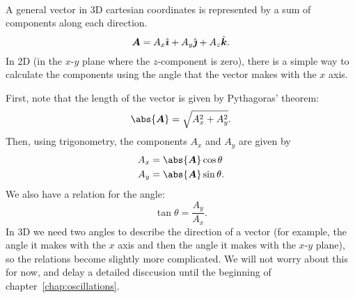 \documentclass[../classical_mechanics.tex]{subfiles}
\begin{document}
        \paragraph{}
        A general vector in 3D cartesian coordinates is represented by a sum of components along each direction.
        \begin{equation}
            \boldsymbol{A}=A_x\hat{\boldsymbol{\imath}}+A_y\hat{\boldsymbol{\jmath}}+A_z\hat{\boldsymbol{k}}.
        \end{equation}
        In 2D (in the $x$-$y$ plane where the $z$-component is zero), there is a simple way to calculate the components using the angle that the vector makes with the $x$ axis.
        \begin{figure}[H]
            \centering
        \end{figure}
        First, note that the length of the vector is given by Pythagoras' theorem:
        \begin{equation}\label{eq:2d-polar-length}
            \abs{\vec{A}}=\sqrt{A_x^2+A_y^2}.
        \end{equation}
        Then, using trigonometry, the components $A_x$ and $A_y$ are given by
        \begin{align}
            A_x&=\abs{\vec{A}}\cos\theta\label{eq:2d-polar-x-component}\\
            A_y&=\abs{\vec{A}}\sin\theta\label{eq:2d-polar-y-component}.
        \end{align}
        We also have a relation for the angle:
        \begin{equation}
            \tan\theta=\frac{A_y}{A_x}\label{eq:2d-polar-theta}.
        \end{equation}
        In 3D we need two angles to describe the direction of a vector (for example, the angle it makes with the $x$ axis and then the angle it makes with the $x$-$y$ plane), so the relations become slightly more complicated.
        We will not worry about this for now, and delay a detailed disccusion until the beginning of chapter~\ref{chap:oscillations}.
\end{document}

